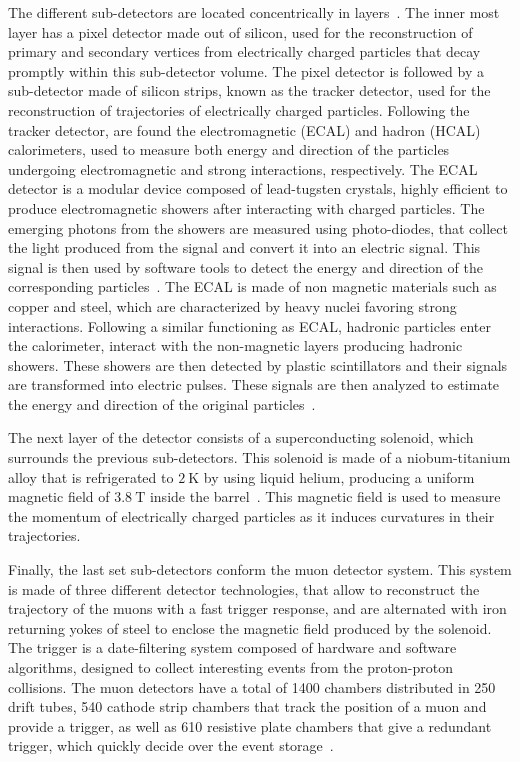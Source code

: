 The different sub-detectors are located concentrically in layers~\parencite{Collaboration_2008}. The inner most layer has a pixel detector made out of silicon, used for the reconstruction of primary and secondary vertices from electrically charged particles that decay promptly within this sub-detector volume. The pixel detector is followed by a sub-detector made of silicon strips, known as the tracker detector, used for the reconstruction of trajectories of electrically charged particles. Following the tracker detector, are found the electromagnetic (ECAL) and hadron (HCAL) calorimeters, used to measure both energy and direction of the particles undergoing electromagnetic and strong interactions, respectively. The ECAL detector is a modular device composed of lead-tugsten crystals, highly efficient to produce electromagnetic showers after interacting with charged particles. The emerging photons from the showers are measured using photo-diodes, that collect the light produced from the signal and convert it into an electric signal. This signal is then used by software tools to detect the energy and direction of the corresponding particles~\parencite{Collaboration_2008}. The ECAL is made of non magnetic materials such as copper and steel, which are characterized by heavy nuclei favoring strong interactions. Following a similar functioning as ECAL, hadronic particles enter the calorimeter, interact with the non-magnetic layers producing hadronic showers. These showers are then detected by plastic scintillators and their signals are transformed into electric pulses. These signals are then analyzed to estimate the energy and direction of the original particles~\parencite{Collaboration_2008}.

The next layer of the detector consists of a superconducting solenoid, which surrounds the previous sub-detectors. This solenoid is made of a niobum-titanium alloy that is refrigerated to $2 \mathrm{~K}$ by using liquid helium, producing a uniform magnetic field of $3.8 \mathrm{~T}$ inside the barrel~\parencite{Collaboration_2008}. This magnetic field is used to measure the momentum of electrically charged particles as it induces curvatures in their trajectories.

Finally, the last set sub-detectors conform the muon detector system. This system is made of three different detector technologies, that allow to reconstruct the trajectory of the muons with a fast trigger response, and are alternated with iron returning yokes of steel to enclose the magnetic field produced by the solenoid. The trigger is a date-filtering system composed of hardware and software algorithms, designed to collect interesting events from the proton-proton collisions. The muon detectors have a total of 1400 chambers distributed in 250 drift tubes, 540 cathode strip chambers that track the position of a muon and provide a trigger, as well as 610 resistive plate chambers that give a redundant trigger, which quickly decide over the event storage~\parencite{Collaboration_2008}.

